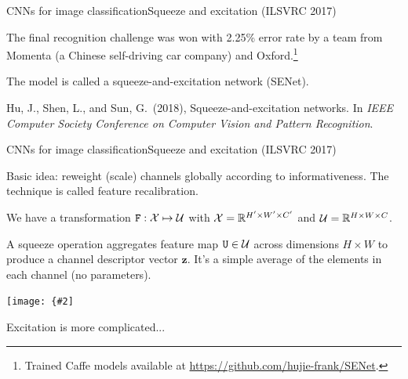 \documentclass[aspectratio=169]{beamer}
\renewcommand{\vec}[1]{\boldsymbol{#1}}
\newcommand{\mat}[1]{\mathtt{#1}}
\def\Rset{\mathbb{R}}
\newcommand{\myfig}[3]{\centerline{\texttt{[image: \{\#2]}}}
\begin{document}
\begin{frame}{CNNs for image classification}{Squeeze and excitation (ILSVRC 2017)}

  The final recognition challenge was won with 2.25\% error rate by a
  team from Momenta (a Chinese self-driving car company) and
  Oxford.\footnote{Trained Caffe models available at
    \url{https://github.com/hujie-frank/SENet}.}

  \medskip

  The model is called a squeeze-and-excitation network (SENet).
  
  \medskip

  Hu, J., Shen, L., and Sun, G.\ (2018), Squeeze-and-excitation
  networks.  In \textit{IEEE Computer Society Conference on Computer
    Vision and Pattern Recognition}.

\end{frame}


\begin{frame}{CNNs for image classification}{Squeeze and excitation (ILSVRC 2017)}

  Basic idea: reweight (scale) channels globally according to
  informativeness. The technique is called \alert{feature
    recalibration}.

  \medskip

  We have a transformation $\mat{F} : {\cal X} \mapsto {\cal U}$ with
  ${\cal X} = \Rset^{H' \times W' \times C'}$ and ${\cal U} =
  \Rset^{H\times W\times C}$.

  \medskip

  A \alert{squeeze} operation aggregates feature map $\mat{U} \in
  {\cal U}$ across dimensions $H \times W$ to produce a \alert{channel
    descriptor} vector $\vec{z}$. It's a simple average of the
  elements in each channel (no parameters).

  \medskip
  
  \myfig{4in}{hu-fig1}{Hu, Shen, and Sun (2018), Fig.\ 1}

  \medskip

  Excitation is more complicated...
  
\end{frame}
\end{document}

